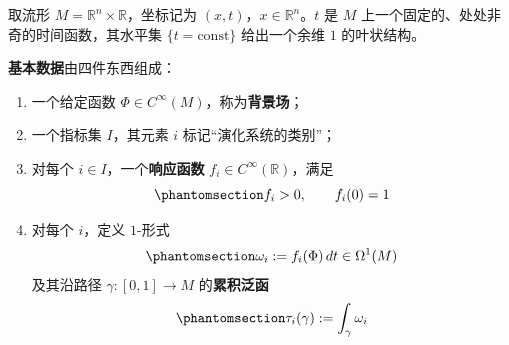\documentclass[
  chinese,
  a4paper,
  UTF8,
  12pt,
  oneside,
  openany]{ctexbook}
\providecommand{\tightlist}{%
  \setlength{\itemsep}{0pt}\setlength{\parskip}{0pt}}
\theoremstyle{plain}
\theoremstyle{plain}
\theoremstyle{plain}
\theoremstyle{definition}
\theoremstyle{plain}
\theoremstyle{plain}
\theoremstyle{remark}
\begin{document}
取流形 \(M = \mathbb{R}^{n}\times\mathbb{R}\)，坐标记为
\((x,t)\)，\(x\in\mathbb{R}^{n}\)。\(t\) 是 \(M\)
上一个固定的、处处非奇的时间函数，其水平集 \(\{t = \text{const}\}\)
给出一个余维 \(1\) 的叶状结构。

\textbf{基本数据}由四件东西组成：

\begin{enumerate}
\def\labelenumi{\arabic{enumi}.}
\tightlist
\item
  一个给定函数 \(\Phi \in C^{\infty}(M)\)，称为\textbf{背景场}；
\item
  一个指标集 \(I\)，其元素 \(i\) 标记``演化系统的类别''；
\item
  对每个 \(i\in I\)，一个\textbf{响应函数}
  \(f_i \in C^{\infty}(\mathbb{R})\)，满足
  \begin{equation}\protect\phantomsection\label{eq-response-conditions}{
  f_i > 0,
  \qquad
  f_i(0) = 1
  }\end{equation}
\item
  对每个 \(i\)，定义 \(1\)-形式
  \begin{equation}\protect\phantomsection\label{eq-omega}{
  \omega_i := f_i(\Phi)\,dt \in \Omega^{1}(M)
  }\end{equation} 及其沿路径 \(\gamma:[0,1]\to M\) 的\textbf{累积泛函}
  \begin{equation}\protect\phantomsection\label{eq-tau-path}{
  \tau_i(\gamma) := \int_{\gamma}\omega_i
  }\end{equation}
\end{enumerate}
\end{document}
